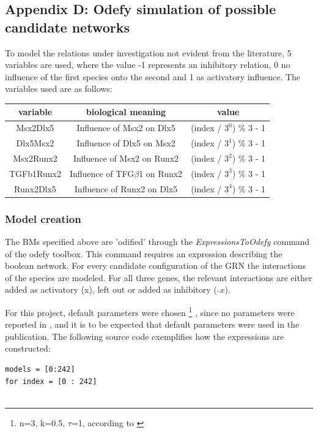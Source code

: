 \documentclass[11pt]{article}
\begin{document}
\begin{appendices}
\section*{Appendix D: Odefy simulation of possible candidate networks} \label{AppendixD}

To model the relations under investigation not evident from the literature, 5 variables are used, where the value -1 represents an inhibitory relation, 0 no influence of the first species onto the second and 1 as activatory influence. The variables used are as follows: \\

\begin{tabular}{c c c}
\textbf{variable} & \textbf{biological meaning} & \textbf{value} \\
\hline
Msx2Dlx5 & Influence of Msx2 on Dlx5 & (index / $3^{0}$) \% 3 - 1 \\
Dlx5Msx2 &  Influence of Dlx5 on Msx2 & (index / $3^{1}$) \% 3 - 1 \\ 
Msx2Runx2 &  Influence of Msx2 on Runx2 & (index / $3^{2}$) \% 3 - 1 \\ 
TGFb1Runx2 &  Influence of TFG$\beta$1 on Runx2 & (index / $3^{3}$) \% 3 - 1 \\ 
Runx2Dlx5 &  Influence of Runx2 on Dlx5 & (index / $3^{4}$) \% 3 - 1 \\
\end{tabular}

\subsubsection*{Model creation} \label{sssec:Modelcreation}
The BMs specified above are 'odified' through the \textit{ExpressionsToOdefy} command of the odefy toolbox. This command requires an expression describing the boolean network. For every candidate configuration of the GRN the interactions of the species are modeled. For all three genes, the relevant
interactions are either added as activatory (x), left out or added as inhibitory ( $\tilde{} x$).

For this project, default parameters were chosen \footnote{n=3, k=0.5, $\tau$=1, according to \cite{Krumsiek}} , since no parameters were reported in \cite{Kirkham}, and it is to be expected that default parameters were used in the publication. The following source code exemplifies how the expressions are constructed:

\begin{lstlisting}[breaklines=true]
models = [0:242]
for index = [0 : 242]


\end{lstlisting}
\end{appendices}
\end{document}
